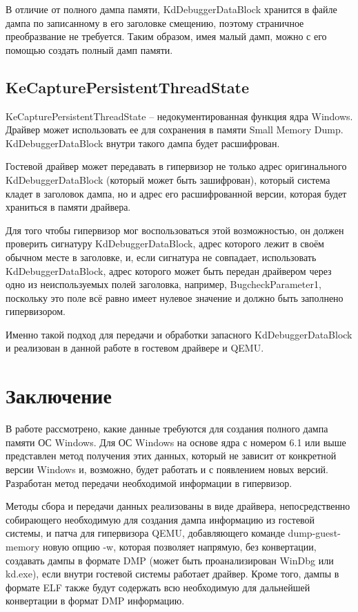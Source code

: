 \documentclass{mipt-thesis-bs}
\begin{document}
В отличие от полного дампа памяти, KdDebuggerDataBlock хранится в файле дампа по записанному в его заголовке смещению, поэтому страничное преобразвание не требуется. Таким образом, имея малый дамп, можно с его помощью создать полный дамп памяти.

\section*{KeCapturePersistentThreadState}

KeCapturePersistentThreadState -- недокументированная функция ядра Windows. Драйвер может использовать ее для сохранения в памяти Small Memory Dump. KdDebuggerDataBlock внутри такого дампа будет расшифрован.

Гостевой драйвер может передавать в гипервизор не только адрес оригинального KdDebuggerDataBlock (который может быть зашифрован), который система кладет в заголовок дампа, но и адрес его расшифрованной версии, которая будет храниться в памяти драйвера.

Для того чтобы гипервизор мог воспользоваться этой возможностью, он должен проверить сигнатуру KdDebuggerDataBlock, адрес которого лежит в своём обычном месте в заголовке, и, если сигнатура не совпадает, использовать KdDebuggerDataBlock, адрес которого может быть передан драйвером через одно из неиспользуемых полей заголовка, например, BugcheckParameter1, поскольку это поле всё равно имеет нулевое значение и должно быть заполнено гипервизором.

Именно такой подход для передачи и обработки запасного KdDebuggerDataBlock и реализован в данной работе в гостевом драйвере и QEMU.

\chapter{Заключение}

В работе рассмотрено, какие данные требуются для создания полного дампа памяти ОС Windows. Для ОС Windows на основе ядра с номером 6.1 или выше представлен метод получения этих данных, который не зависит от конкретной версии Windows и, возможно, будет работать и с появлением новых версий. Разработан метод передачи необходимой информации в гипервизор.

Методы сбора и передачи данных реализованы в виде драйвера, непосредственно собирающего необходимую для создания дампа информацию из гостевой системы, и патча для гипервизора QEMU, добавляющего команде dump-guest-memory новую опцию -w, которая позволяет напрямую, без конвертации, создавать дампы в формате DMP (может быть проанализирован WinDbg или kd.exe), если внутри гостевой системы работает драйвер. Кроме того, дампы в формате ELF также будут содержать всю необходимую для дальнейшей конвертации в формат DMP информацию.
\end{document}
